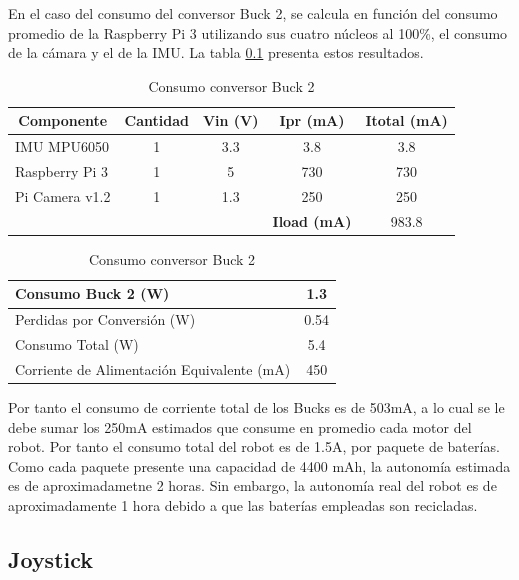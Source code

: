En el caso del consumo del conversor Buck 2, se calcula  en función del consumo promedio de la Raspberry Pi 3 utilizando sus cuatro núcleos al 100\%, el consumo de la cámara y el de la IMU. La tabla \ref{} presenta estos resultados.

\begin{table}[htbp]
	\caption{Consumo conversor Buck 2}
	\begin{tabular}{|l|c|c|c|c|}
		\hline
		\multicolumn{1}{|c|}{\textbf{Componente}} & \textbf{Cantidad} & \textbf{ Vin (V)} & \textbf{ Ipr (mA)} & \textbf{Itotal (mA)} \\ \hline
		IMU MPU6050 & 1 & 3.3 & 3.8 & 3.8 \\ \hline
		Raspberry Pi 3  & 1 & 5 & 730 & 730 \\ \hline
		Pi Camera  v1.2 & 1 & 1.3 & 250 & 250 \\ \hline
		& \multicolumn{1}{l|}{} & \multicolumn{1}{l|}{} & \textbf{Iload (mA)} & 983.8 \\ \hline
	\end{tabular}
	\label{Buck2}
\end{table}

\begin{table}[htbp]
	\caption{Consumo conversor Buck 2}
	\begin{tabular}{|l|c|}
		\hline
		Consumo Buck 2 (W) & 1.3 \\ \hline
		Perdidas por Conversión (W) & 0.54 \\ \hline
		Consumo Total (W) & 5.4 \\ \hline
		Corriente de Alimentación Equivalente (mA) & 450 \\ \hline
	\end{tabular}
	\label{Buck2Perdidas}
\end{table}

Por tanto el consumo de corriente total de los Bucks es de  503mA, a lo cual se le debe sumar los 250mA estimados que consume en promedio cada motor del robot. Por tanto el consumo total del robot es de 1.5A, por paquete de baterías. Como cada paquete presente una capacidad de 4400 mAh, la autonomía estimada es de aproximadametne 2 horas. Sin embargo, la autonomía real del robot es de aproximadamente 1 hora debido a que las baterías empleadas son recicladas.

\subsection{Joystick}




